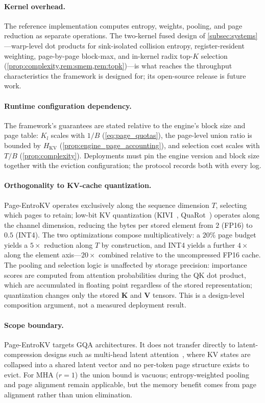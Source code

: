 \documentclass[final,5p,times,twocolumn]{elsarticle}
\theoremstyle{definition}
\theoremstyle{remark}
\newcommand{\method}{Page-EntroKV}
\newcommand{\HKV}{H_{\mathrm{KV}}}
\begin{document}
\paragraph{Kernel overhead.}
The reference implementation computes entropy, weights, pooling, and
page reduction as separate operations. The two-kernel fused design of
\cref{subsec:systems}---warp-level dot products for sink-isolated
collision entropy, register-resident weighting, page-by-page block-max,
and in-kernel radix top-$K$ selection
(\cref{prop:complexity,rem:smem,rem:topk})---is what reaches the
throughput characteristics the framework is designed for; its
open-source release is future work.

\paragraph{Runtime configuration dependency.}
The framework's guarantees are stated relative to the engine's block
size and page table: $K_l$ scales with $1/B$ (\cref{eq:page_quotas}),
the page-level union ratio is bounded by $\HKV$ (\cref{prop:engine_page_accounting}), and selection cost scales with
 $T/B$ (\cref{prop:complexity}). Deployments must pin the engine version
and block size together with the eviction configuration; the protocol
records both with every log.

\paragraph{Orthogonality to KV-cache quantization.}
\method{} operates exclusively along the sequence dimension $T$,
selecting which pages to retain; low-bit KV quantization
(KIVI~\cite{liu2024kivi}, QuaRot~\cite{ashkboos2024quarot}) operates
along the channel dimension, reducing the bytes per stored element
from $2$ (FP16) to $0.5$ (INT4). The two optimizations compose
multiplicatively: a $20\%$ page budget yields a $5\times$ reduction
along $T$ by construction, and INT4 yields a further $4\times$ along
the element axis---$20\times$ combined relative to the uncompressed
FP16 cache. The pooling and selection logic is unaffected by storage
precision: importance scores are computed from attention probabilities
during the QK dot product, which are accumulated in floating point
regardless of the stored representation; quantization changes only the
stored $\mathbf{K}$ and $\mathbf{V}$ tensors. This is a design-level
composition argument, not a measured deployment result.

\paragraph{Scope boundary.}
\method{} targets GQA architectures. It does not transfer directly to
latent-compression designs such as multi-head latent
attention~\cite{deepseek2024deepseekv2}, where KV states are collapsed
into a shared latent vector and no per-token page structure exists to
evict. For MHA ($r=1$) the union bound is vacuous; entropy-weighted
pooling and page alignment remain applicable, but the memory benefit
comes from page alignment rather than union elimination.
\end{document}
